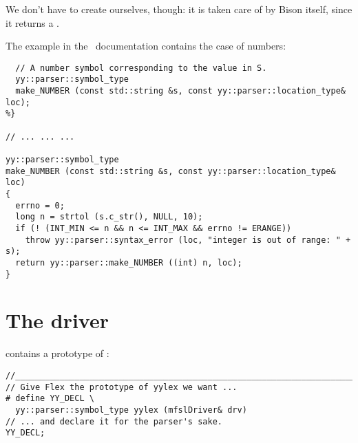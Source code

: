 We don't have to create  ourselves, though: it is taken care of by Bison itself, since it returns a .

The  example in the \bison\ documentation contains the case of numbers:
\begin{lstlisting}[language=Flex]
%{
  // A number symbol corresponding to the value in S.
  yy::parser::symbol_type
  make_NUMBER (const std::string &s, const yy::parser::location_type& loc);
%}

// ... ... ...

yy::parser::symbol_type
make_NUMBER (const std::string &s, const yy::parser::location_type& loc)
{
  errno = 0;
  long n = strtol (s.c_str(), NULL, 10);
  if (! (INT_MIN <= n && n <= INT_MAX && errno != ERANGE))
    throw yy::parser::syntax_error (loc, "integer is out of range: " + s);
  return yy::parser::make_NUMBER ((int) n, loc);
}
\end{lstlisting}


\section{The driver}

 contains a prototype of :
\begin{lstlisting}[language=CPlusPlus]
//______________________________________________________________________________
// Give Flex the prototype of yylex we want ...
# define YY_DECL \
  yy::parser::symbol_type yylex (mfslDriver& drv)
// ... and declare it for the parser's sake.
YY_DECL;
\end{lstlisting}

